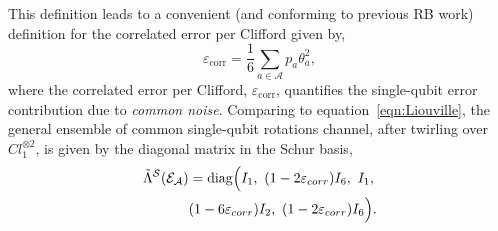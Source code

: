 This definition leads to a convenient (and conforming to previous RB work) definition for the correlated error per Clifford given by,
\begin{equation}
\label{eqn:e_corr}
\varepsilon_\mathrm{corr}=\frac{1}{6}\sum_{a\in\mathcal{A}}p_a\theta_a^2,
\end{equation}
where the correlated error per Clifford, $\varepsilon_\mathrm{corr}$, quantifies the single-qubit error contribution due to \textit{common noise}.
Comparing to equation~\ref{eqn:Liouville}, the general ensemble of common single-qubit rotations channel, after twirling over $Cl_1^{\otimes 2}$, is given by the diagonal matrix in the Schur basis,
\begin{equation}
\begin{split}
    \tilde\Lambda^\mathcal{S}(\mathcal{E}_\mathcal{A}) &= \mathrm{diag}\Bigl(I_1,~(1-2\varepsilon_{corr}) I_6,~I_1, \\ & (1-6\varepsilon_{corr}) I_2,~(1-2\varepsilon_{corr}) I_6\Bigr).
\end{split}
\end{equation}

